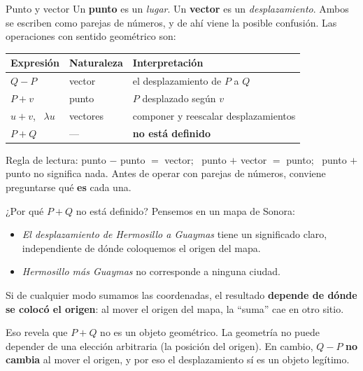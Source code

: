 \documentclass[aspectratio=169,10pt]{beamer}
\newcommand{\destaca}[1]{%
  \par\vspace{3pt}\noindent
  \colorbox{turquesaClaro}{%
    \parbox{\dimexpr\linewidth-2\fboxsep\relax}{\vspace{3pt}#1\vspace{3pt}}}%
  \par\vspace{3pt}}
\begin{document}
\begin{frame}{Punto y vector}
  Un \textcolor{turquesaGA}{\textbf{punto}} es un \textit{lugar}.
  Un \textcolor{terracota}{\textbf{vector}} es un \textit{desplazamiento}.
  Ambos se escriben como parejas de números, y de ahí viene la posible
  confusión. Las operaciones con sentido geométrico son:

  \vspace{0.3cm}
  \begin{center}
  {\small
  \begin{tabular}{@{}lll@{}}
    \toprule
    \textbf{Expresión} & \textbf{Naturaleza} & \textbf{Interpretación} \\
    \midrule
    $Q-P$ & \textcolor{terracota}{vector} & el desplazamiento de $P$ a $Q$ \\
    $P+v$ & \textcolor{turquesaGA}{punto} & $P$ desplazado según $v$ \\
    $u+v$, \ $\lambda u$ & \textcolor{terracota}{vectores} & componer y reescalar desplazamientos \\
    $P+Q$ & --- & \textcolor{rojoAc}{\textbf{no está definido}} \\
    \bottomrule
  \end{tabular}}
  \end{center}

  \vspace{0.3cm}
  \destaca{Regla de lectura: punto $-$ punto $=$ vector; \ punto $+$
  vector $=$ punto; \ punto $+$ punto no significa nada. Antes de operar
  con parejas de números, conviene preguntarse qué \textbf{es} cada una.}
\end{frame}
\begin{frame}{¿Por qué $P+Q$ no está definido?}
  Pensemos en un mapa de Sonora:

  \vspace{0.2cm}
  \begin{itemize}
    \item \textit{El desplazamiento de Hermosillo a Guaymas} tiene un
      significado claro, independiente de dónde coloquemos el origen
      del mapa.

      \vspace{0.2cm}
    \item \textit{Hermosillo más Guaymas} no corresponde a ninguna
      ciudad.
  \end{itemize}

  \vspace{0.4cm}
  Si de cualquier modo sumamos las coordenadas, el resultado
  \textbf{depende de dónde se colocó el origen}: al mover el origen del
  mapa, la ``suma'' cae en otro sitio.

  \vspace{0.3cm}
  \destaca{Eso revela que $P+Q$ no es un objeto geométrico. La geometría
  no puede depender de una elección arbitraria (la posición del origen).
  En cambio, $Q-P$ \textbf{no cambia} al mover el origen, y por eso el
  desplazamiento sí es un objeto legítimo.}
\end{frame}
\end{document}
